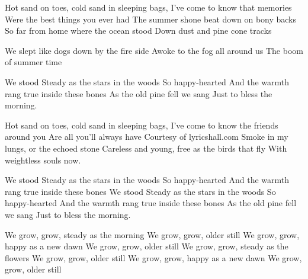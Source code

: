 \resetVars%
%
%
%
\makeheader%
\lyrics%
Hot sand on toes, cold sand in sleeping bags,
I've come to know that memories
Were the best things you ever had
The summer shone beat down on bony backs
So far from home where the ocean stood
Down dust and pine cone tracks

We slept like dogs down by the fire side
Awoke to the fog all around us
The boom of summer time

We stood
Steady as the stars in the woods
So happy-hearted
And the warmth rang true inside these bones
As the old pine fell we sang
Just to bless the morning.

Hot sand on toes, cold sand in sleeping bags,
I've come to know the friends around you
Are all you'll always have
Courtesy of lyricshall.com
Smoke in my lungs, or the echoed stone
Careless and young, free as the birds that fly
With weightless souls now.

We stood
Steady as the stars in the woods
So happy-hearted
And the warmth rang true inside these bones
We stood
Steady as the stars in the woods
So happy-hearted
And the warmth rang true inside these bones
As the old pine fell we sang
Just to bless the morning.

We grow, grow, steady as the morning
We grow, grow, older still
We grow, grow, happy as a new dawn
We grow, grow, older still
We grow, grow, steady as the flowers
We grow, grow, older still
We grow, grow, happy as a new dawn
We grow, grow, older still\next
